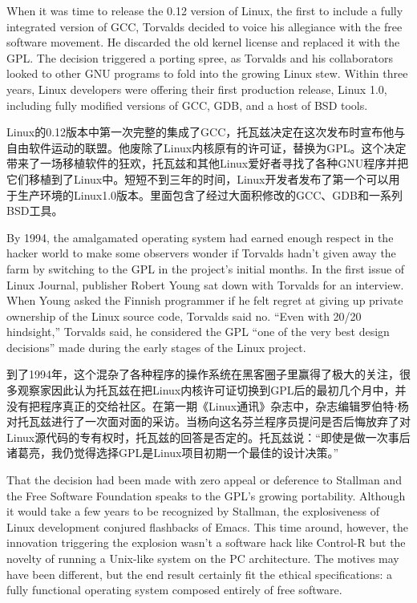\ifdefined\eng
When it was time to release the 0.12 version of Linux, the first to include a fully integrated version of GCC, Torvalds decided to voice his allegiance with the free software movement. He discarded the old kernel license and replaced it with the GPL. The decision triggered a porting spree, as Torvalds and his collaborators looked to other GNU programs to fold into the growing Linux stew. Within three years, Linux developers were offering their first production release, Linux 1.0, including fully modified versions of GCC, GDB, and a host of BSD tools.
\fi

\ifdefined\chs
Linux的0.12版本中第一次完整的集成了GCC，托瓦兹决定在这次发布时宣布他与自由软件运动的联盟。他废除了Linux内核原有的许可证，替换为GPL。这个决定带来了一场移植软件的狂欢，托瓦兹和其他Linux爱好者寻找了各种GNU程序并把它们移植到了Linux中。短短不到三年的时间，Linux开发者发布了第一个可以用于生产环境的Linux1.0版本。里面包含了经过大面积修改的GCC、GDB和一系列BSD工具。
\fi


\ifdefined\eng
By 1994, the amalgamated operating system had earned enough respect in the hacker world to make some observers wonder if Torvalds hadn't given away the farm by switching to the GPL in the project's initial months. In the first issue of Linux Journal, publisher Robert Young sat down with Torvalds for an interview. When Young asked the Finnish programmer if he felt regret at giving up private ownership of the Linux source code, Torvalds said no. ``Even with 20/20 hindsight,'' Torvalds said, he considered the GPL ``one of the very best design decisions'' made during the early stages of the Linux project.
\fi

\ifdefined\chs
到了1994年，这个混杂了各种程序的操作系统在黑客圈子里赢得了极大的关注，很多观察家因此认为托瓦兹在把Linux内核许可证切换到GPL后的最初几个月中，并没有把程序真正的交给社区。在第一期《Linux通讯》杂志中，杂志编辑罗伯特⋅杨对托瓦兹进行了一次面对面的采访。当杨向这名芬兰程序员提问是否后悔放弃了对Linux源代码的专有权时，托瓦兹的回答是否定的。托瓦兹说：``即使是做一次事后诸葛亮，我仍觉得选择GPL是Linux项目初期一个最佳的设计决策。''
\fi

\ifdefined\eng
That the decision had been made with zero appeal or deference to Stallman and the Free Software Foundation speaks to the GPL's growing portability. Although it would take a few years to be recognized by Stallman, the explosiveness of Linux development conjured flashbacks of Emacs. This time around, however, the innovation triggering the explosion wasn't a software hack like Control-R but the novelty of running a Unix-like system on the PC architecture. The motives may have been different, but the end result certainly fit the ethical specifications: a fully functional operating system composed entirely of free software.
\fi

